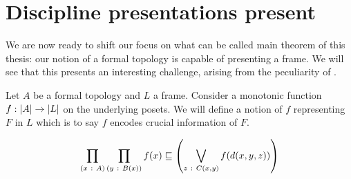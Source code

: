 \section{Discipline presentations present}

We are now ready to shift our focus on what can be called main theorem of this
thesis: our notion of a formal topology is capable of presenting a frame. We
will see that this presents an interesting challenge, arising from the
peculiarity of \UF{}.

Let $A$ be a formal topology and $L$ a frame. Consider a monotonic function $f : \left| A \right| \rightarrow
\left| L \right|$ on the underlying posets. We will define a notion of $f$ representing $F$ in $L$
which is to say $f$ encodes crucial information of $F$.

\begin{defn}[Representation]
  \begin{equation*}
  \prod_{(x~:~A)} \prod_{(y~:~B(x))} f(x) \sqsubseteq \left( \bigvee_{z~:~C(x, y)} f(d(x, y, z)) \right)
  \end{equation*}
\end{defn}


